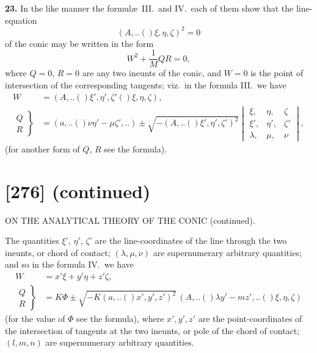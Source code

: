 \documentclass[11pt,a4paper]{book}
\providecommand{\qform}[1]{(#1)}
\begin{document}
\textbf{23.} In the like manner the formul\ae\ III.\ and IV.\ each of them show that the line-equation
\[
(A,..\!\qform{}{\xi, \eta, \zeta})^{2} = 0
\]
of the conic may be written in the form
\[
W^{2} + \frac{1}{M}QR = 0,
\]
where $Q = 0$, $R = 0$ are any two ineunts of the conic, and $W = 0$ is the point of intersection of the corresponding tangents; viz.\ in the formula III.\ we have
\begin{align*}
W &= (A,..\!\qform{}{\xi', \eta', \zeta'}\!\qform{}{\xi, \eta, \zeta}),\\
\left.\begin{array}{c} Q \\ R \end{array}\right\}
&= (a,..\!\qform{}{\nu\eta' - \mu\zeta',..})
\pm \sqrt{-(A,..\!\qform{}{\xi', \eta', \zeta'})^{2}}
\begin{vmatrix}
\xi, & \eta, & \zeta \\
\xi', & \eta', & \zeta' \\
\lambda, & \mu, & \nu
\end{vmatrix},
\end{align*}
(for another form of $Q$, $R$ see the formula).

\newpage
\section*{[276] (continued)}
\begin{center}
{\large ON THE ANALYTICAL THEORY OF THE CONIC (continued).}
\end{center}

The quantities $\xi'$, $\eta'$, $\zeta'$ are the line-coordinates of the line through the two ineunts, or chord of contact; $(\lambda, \mu, \nu)$ are supernumerary arbitrary quantities; and so in the formula IV.\ we have
\begin{align*}
W &= x'\xi + y'\eta + z'\zeta,\\
\left.\begin{array}{c} Q \\ R \end{array}\right\}
&= K\Phi \pm \sqrt{-K(a,..\!\qform{}{x', y', z'})^{2}}\,(A,..\!\qform{}{\lambda y' - mz',..}\!\qform{}{\xi, \eta, \zeta})
\end{align*}
(for the value of $\Phi$ see the formula), where $x', y', z'$ are the point-coordinates of the intersection of tangents at the two ineunts, or pole of the chord of contact; $(l, m, n)$ are supernumerary arbitrary quantities.
\end{document}
